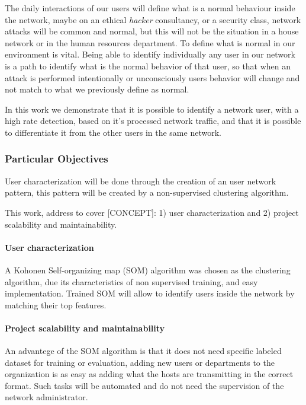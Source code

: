 \documentclass{article}
\begin{document}
The daily interactions of our users will define what is a normal behaviour inside the network, maybe on an ethical \textit{hacker} consultancy, or a security class, network attacks will be common and normal, but this will not be the situation in a house network or in the human resources department. To define what is normal in our environment is vital.
Being able to identify individually any user in our network is a path to identify what is the normal behavior of that user, so that when an attack is performed intentionally or unconsciously users behavior will change and not match to what we previously define as normal.

In this work we demonstrate that it is possible to identify a network user, with a high rate detection, based on it's processed network traffic, and that it is possible to differentiate it from the other users in the same network.

\subsubsection{Particular Objectives} %
User characterization will be done through the creation of an user network pattern, this pattern will be created by a non-supervised clustering algorithm.

This work, address to cover [CONCEPT]: 1) user characterization and 2) project scalability and maintainability.

\paragraph{User characterization} %
A Kohonen Self-organizing map (SOM) algorithm was chosen as the clustering algorithm, due its characteristics of non supervised training, and easy implementation. Trained SOM will allow to identify users inside the network by matching their top features.

\paragraph{Project scalability and maintainability} %
An advantege of the SOM algorithm is that it does not need specific labeled dataset for training or evaluation, adding new users or departments to the organization is as easy as adding what the hosts are transmitting in the correct format. Such tasks will be automated and do not need the supervision of the network administrator.
\end{document}
